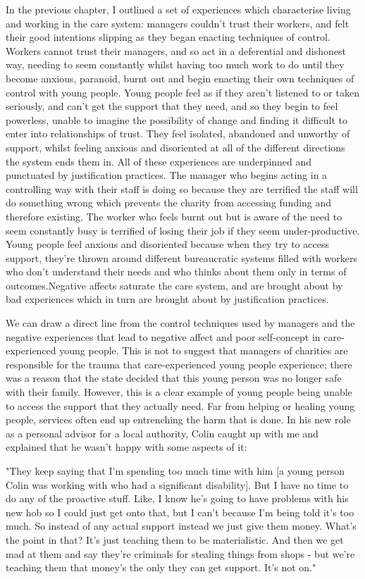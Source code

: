 In the previous chapter, I outlined a set of experiences which characterise living and working in the care system: managers couldn't trust their workers, and felt their good intentions slipping as they began enacting techniques of control. Workers cannot trust their managers, and so act in a deferential and dishonest way, needing to seem constantly whilst having too much work to do until they become anxious, paranoid, burnt out and begin enacting their own techniques of control with young people. Young people feel as if they aren't listened to or taken seriously, and can't get the support that they need, and so they begin to feel powerless, unable to imagine the possibility of change and finding it difficult to enter into relationships of trust. They feel isolated, abandoned and unworthy of support, whilst feeling anxious and disoriented at all of the different directions the system ends them in. All of these experiences are underpinned and punctuated by justification practices. The manager who begins acting in a controlling way with their staff is doing so because they are terrified the staff will do something wrong which prevents the charity from accessing funding and therefore existing. The worker who feels burnt out but is aware of the need to seem constantly busy is terrified of losing their job if they seem under-productive. Young people feel anxious and disoriented because when they try to access support, they're thrown around different bureaucratic systems filled with workers who don't understand their needs and who thinks about them only in terms of outcomes.Negative affects saturate the care system, and are brought about by bad experiences which in turn are brought about by justification practices.

We can draw a direct line from the control techniques used by managers and the negative experiences that lead to negative affect and poor self-concept in care-experienced young people. This is not to suggest that managers of charities are responsible for the trauma that care-experienced young people experience; there was a reason that the state decided that this young person was no longer safe with their family. However, this is a clear example of young people being unable to access the support that they actually need. Far from helping or healing young people, services often end up entrenching the harm that is done. In his new role as a personal advisor for a local authority, Colin caught up with me and explained that he wasn't happy with some aspects of it:

"They keep saying that I'm spending too much time with him [a young person Colin was working with who had a significant disability]. But I have no time to do any of the proactive stuff. Like, I know he's going to have problems with his new hob so I could just get onto that, but I can't because I'm being told it's too much. So instead of any actual support instead we just give them money. What's the point in that? It's just teaching them to be materialistic. And then we get mad at them and say they're criminals for stealing things from shops - but we're teaching them that money's the only they can get support. It's not on."

